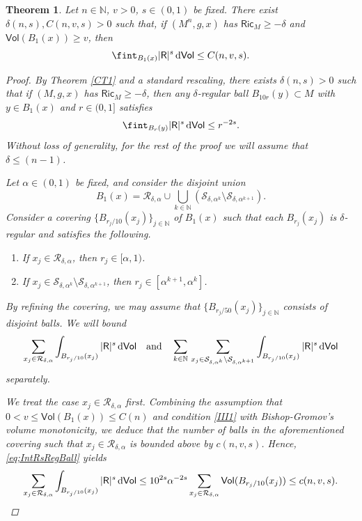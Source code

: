\documentclass[10pt]{article}
\newtheorem{thm}{Theorem}[section]
\theoremstyle{definition}
\newcommand{\bb}[1]{\mathbb{#1}}
\newcommand{\ssf}[1]{\mathsf{#1}}
\newcommand{\Ric}{\mathsf{Ric}}
\newcommand{\R}{\mathsf{R}}
\newcommand{\de}{{\rm d}}
\begin{document}
\begin{thm}\label{thm:IntRsB1Riccidelta}
    Let $n \in \bb{N}$, $v>0$, $s \in (0,1)$ be fixed. There exist $\delta(n,s),C(n,v,s)>0$ such that, if $(M^n,g,x)$ has $\Ric_M \geq -\delta$ and $\ssf{Vol}(B_1(x)) \geq v$, then
    \[
    \fint_{B_{1}(x)} |\R|^s \,\de\ssf{Vol} \leq  C(n,v,s).
    \]
    \begin{proof}
        By Theorem \ref{CT1} and a standard rescaling, there exists $\delta(n,s)>0$ such that if $(M,g,x)$ has $\Ric_M \geq -\delta$, then
        any $\delta$-regular ball $B_{10r}(y) \subset M$ with $y \in B_1(x)$ and $r \in (0,1]$ satisfies
     \begin{equation}\label{eq;IntRsRegBall}
     \fint_{B_r(y)} |\R|^s \, \de \ssf{Vol} \leq r^{-2s}.
     \end{equation}
     Without loss of generality, for the rest of the proof we will assume that $\delta\leq (n-1)$.
    
    Let $\alpha\in (0,1)$ be fixed,  and consider the disjoint union
    \[
    B_1(x)=\mathcal{R}_{\delta,\alpha} \cup \bigcup_{k \in \bb{N}} (\mathcal{S}_{\delta,\alpha^{k}} \setminus \mathcal{S}_{\delta,\alpha^{k+1}}).
    \]
     Consider a covering $\{B_{r_j/10}(x_j)\}_{j \in \bb{N}}$ of $B_1(x)$ such that each $B_{r_j}(x_j)$ is $\delta$-regular and satisfies the following.
     \begin{enumerate}
         \item \label{III1} If $x_j \in \mathcal{R}_{\delta,\alpha}$, then $r_j \in [\alpha,1)$.
         \item If $x_j \in \mathcal{S}_{\delta,\alpha^{k}} \setminus \mathcal{S}_{\delta,\alpha^{k+1}}$, then $r_j \in [\alpha^{k+1},\alpha^k]$.
     \end{enumerate}
     By refining the covering, we may assume that $\{B_{r_j/50}(x_j)\}_{j \in \bb{N}}$ consists of disjoint balls.
     We will bound
    \[
    \sum_{x_j \in \mathcal{R}_{\delta,\alpha} }
    \int_{B_{r_j/10}(x_j)} |\R|^s \,\de\ssf{Vol}
    \quad
    \text{and}
    \quad 
     \sum_{k \in \bb{N}} \, \sum_{x_j \in \mathcal{S}_{\delta,\alpha^{k}} \setminus \mathcal{S}_{\delta,\alpha^{k+1}}}
    \int_{B_{r_j/10}(x_j)} |\R|^s \,\de\ssf{Vol}
    \]
    separately. 
    
    We treat the case $x_j \in \mathcal{R}_{\delta,\alpha}$ first.
    Combining the assumption that $0<v \leq \ssf{Vol}(B_1(x)) \leq C(n)$ and condition \ref{III1} with Bishop-Gromov's volume monotonicity, we deduce that the number of balls in the aforementioned covering such that $x_j \in \mathcal{R}_{\delta,\alpha}$ is bounded above by $c(n,v,s)$. Hence,  \eqref{eq;IntRsRegBall}  yields
    \begin{equation} \label{E14}
    \sum_{x_j \in \mathcal{R}_{\delta,\alpha} }
    \int_{B_{r_j/10}(x_j)} |\R|^s \,\de\ssf{Vol} \leq 10^{2s}\alpha^{-2s} \sum_{x_j \in \mathcal{R}_{\delta,\alpha} }
    \ssf{Vol}({B_{r_j/10}(x_j)}) \leq  c(n,v,s).
    \end{equation}
    

\end{proof}
\end{thm}
\end{document}
